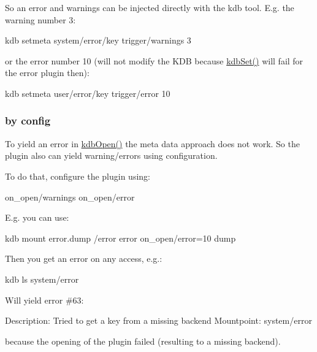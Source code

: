 So an error and warnings can be injected directly with the kdb tool. E.\+g. the warning number 3\+: \begin{DoxyVerb}    kdb setmeta system/error/key trigger/warnings 3
\end{DoxyVerb}


or the error number 10 (will not modify the K\+D\+B because \hyperlink{group__kdb_ga11436b058408f83d303ca5e996832bcf}{kdb\+Set()} will fail for the error plugin then)\+: \begin{DoxyVerb}    kdb setmeta user/error/key trigger/error 10
\end{DoxyVerb}


\subsubsection*{by config}

To yield an error in \hyperlink{group__kdb_ga6808defe5870f328dd17910aacbdc6ca}{kdb\+Open()} the meta data approach does not work. So the plugin also can yield warning/errors using configuration.

To do that, configure the plugin using\+: \begin{DoxyVerb}    on_open/warnings
    on_open/error
\end{DoxyVerb}


E.\+g. you can use\+: \begin{DoxyVerb}    kdb mount error.dump /error error on_open/error=10 dump
\end{DoxyVerb}


Then you get an error on any access, e.\+g.\+: \begin{DoxyVerb}    kdb ls system/error
\end{DoxyVerb}


Will yield error \#63\+: \begin{DoxyVerb}    Description: Tried to get a key from a missing backend
    Mountpoint: system/error
\end{DoxyVerb}


because the opening of the plugin failed (resulting to a missing backend). 